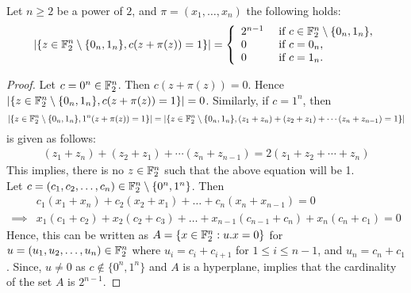 \documentclass{llncs}
\begin{document}
\begin{proposition}
	Let $n\ge 2$ be a power of $2$, and $\pi= (x_1,\ldots,x_n)$ the following holds:
\[ |\{ z \in \mathbb{F}_2^{n} \setminus \{0_{n},1_{n}\},  c(z+\pi(z))=1   \}| 
= \left \{
\begin{array}{l l}
	2^{n-1}  & \text{ if } c \in \mathbb{F}_2^n \setminus \{0_n,1_n\}, \\
	0  & \text{ if } c=0_n,\\
	0 & \text{ if } c=1_n.
\end{array}\right.\]
	
\end{proposition}
\begin{proof}
	Let $ c = 0^n \in \mathbb{F}_2^n$. Then $c(z + \pi(z))=0$. Hence $|\{ z \in \mathbb{F}_2^{n} \setminus \{0_{n},1_{n}\}, c(z+\pi(z))=1   \}| = 0$. Similarly, if $c = 1^n$, then  $$|\{ z \in \mathbb{F}_2^{n} \setminus \{0_{n},1_{n}\}, 1^n(z+\pi(z))=1   \}| = |\{ z \in \mathbb{F}_2^{n} \setminus \{0_{n},1_{n}\}, (z_1 + z_n)+(z_2 + z_1)+ \cdots (z_n + z_{n-1})= 1 \}|$$ is given as follows:
	\begin{align*}
	(z_1 + z_n)+(z_2 + z_1)+ \cdots (z_n + z_{n-1}) = 2(z_1 + z_2 + \cdots + z_n) 
	\end{align*}
	This implies, there is no $z \in \mathbb{F}_2^n$ such that the above equation will be 1. \\
Let $c=(c_1,c_2,\ldots,c_n) \in \mathbb{F}_2^n \setminus \{0^n,1^n\}$. Then 
\begin{align*}
         & c_1(x_1 + x_n) + c_2(x_2 + x_1) + \ldots + c_n (x_n + x_{n-1})  = 0 \\
\implies &  x_1 ( c_1 + c_2) + x_2 (c_2 + c_3) + \ldots + x_{n-1}(c_{n-1} + c_n) + x_n(c_n + c_1)= 0  
\end{align*}
Hence, this can be written as $A= \{ x \in \mathbb{F}_2^n : u. x = 0\}$ for $ u = (u_1,u_2, \ldots,u_n) \in \mathbb{F}_2^n$ where $ u_i = c_i + c_{i+1}$ for $  1 \leq i \leq {n-1} $, and $u_n = c_n + c_1$. Since, $ u \neq 0 $ as $c \not\in \{0^n,1^n\}$ and $A$ is a hyperplane, implies that the cardinality of the set $A$ is $2^{n-1}$.
\end{proof}
\fi

\ifnum{}
%


\else


\end{document}
